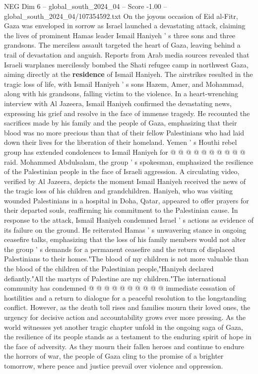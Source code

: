 \begin{textsample}{NEG Dim 6 – global\_south\_2024\_04 – Score -1.00 – global\_south\_2024\_04/107354592.txt}  \label{ex:f6_neg_327}
On the joyous occasion of Eid al-Fitr, Gaza was enveloped in sorrow as Israel launched a devastating attack, claiming the lives of prominent Hamas leader Ismail Haniyeh ' s three sons and three grandsons.
The merciless assault targeted the heart of Gaza, leaving behind a trail of devastation and anguish.
Reports from Arab media sources revealed that Israeli warplanes mercilessly bombed the Shati refugee camp in northwest Gaza, aiming directly at the \textbf{residence} of Ismail Haniyeh.
The airstrikes resulted in the tragic loss of life, with Ismail Haniyeh ' s sons Hazem, Amer, and Mohammad, along with his grandsons, falling victim to the violence.
In a heart-wrenching interview with Al Jazeera, Ismail Haniyeh confirmed the devastating news, expressing his grief and resolve in the face of immense tragedy.
He recounted the sacrifices made by his family and the people of Gaza, emphasizing that their blood was no more precious than that of their fellow Palestinians who had laid down their lives for the liberation of their homeland.
Yemen ' s Houthi rebel group has extended condolences to Ismail Haniyeh for @ @ @ @ @ @ @ @ @ @ raid.
Mohammed Abdulsalam, the group ' s spokesman, emphasized the resilience of the Palestinian people in the face of Israeli aggression.
A circulating video, verified by Al Jazeera, depicts the moment Ismail Haniyeh received the news of the tragic loss of his children and grandchildren.
Haniyeh, who was visiting wounded Palestinians in a hospital in Doha, Qatar, appeared to offer prayers for their departed souls, reaffirming his commitment to the Palestinian cause.
In response to the attack, Ismail Haniyeh condemned Israel ' s actions as evidence of its failure on the ground.
He reiterated Hamas ' s unwavering stance in ongoing ceasefire talks, emphasizing that the loss of his family members would not alter the group ' s demands for a permanent ceasefire and the return of displaced Palestinians to their homes."The blood of my children is not more valuable than the blood of the children of the Palestinian people,"Haniyeh declared defiantly."All the martyrs of Palestine are my children."The international community has condemned @ @ @ @ @ @ @ @ @ @ immediate cessation of hostilities and a return to dialogue for a peaceful resolution to the longstanding conflict.
However, as the death toll rises and families mourn their loved ones, the urgency for decisive action and accountability grows ever more pressing.
As the world witnesses yet another tragic chapter unfold in the ongoing saga of Gaza, the resilience of its people stands as a testament to the enduring spirit of hope in the face of adversity.
As they mourn their fallen heroes and continue to endure the horrors of war, the people of Gaza cling to the promise of a brighter tomorrow, where peace and justice prevail over violence and oppression.

\end{textsample}
